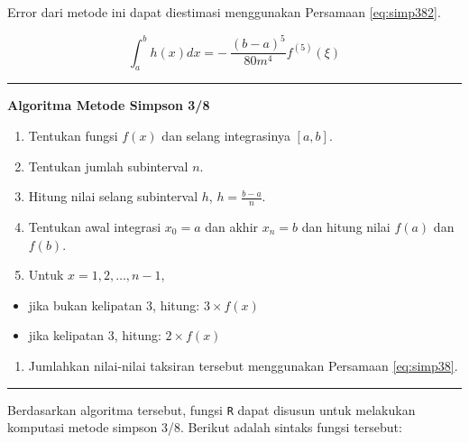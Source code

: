 \documentclass[
]{book}
\providecommand{\tightlist}{%
  \setlength{\itemsep}{0pt}\setlength{\parskip}{0pt}}
\theoremstyle{definition}
\theoremstyle{definition}
\theoremstyle{definition}
\theoremstyle{definition}
\theoremstyle{remark}
\begin{document}
Error dari metode ini dapat diestimasi menggunakan Persamaan \eqref{eq:simp382}.

\begin{equation}
\int_a^bh\left(x\right)dx=-\ \frac{\left(b-a\right)^5}{80m^4}f^{\left(5\right)}\left(\xi\right)
  \label{eq:simp382}
\end{equation}

\begin{center}\rule{0.5\linewidth}{0.5pt}\end{center}

\textbf{Algoritma Metode Simpson 3/8}

\begin{enumerate}
\def\labelenumi{\arabic{enumi}.}
\tightlist
\item
  Tentukan fungsi \(f\left(x\right)\) dan selang integrasinya \(\left[a,b\right]\).
\item
  Tentukan jumlah subinterval \(n\).
\item
  Hitung nilai selang subinterval \(h\), \(h=\frac{b-a}{n}\).
\item
  Tentukan awal integrasi \(x_0=a\) dan akhir \(x_n=b\) dan hitung nilai \(f\left(a\right)\) dan \(f\left(b\right)\).
\item
  Untuk \(x=1,2,\dots,n-1\),
\end{enumerate}

\begin{itemize}
\tightlist
\item
  jika bukan kelipatan 3, hitung: \(3\times f\left(x\right)\)
\item
  jika kelipatan 3, hitung: \(2\times f\left(x\right)\)
\end{itemize}

\begin{enumerate}
\def\labelenumi{\arabic{enumi}.}
\setcounter{enumi}{5}
\tightlist
\item
  Jumlahkan nilai-nilai taksiran tersebut menggunakan Persamaan \eqref{eq:simp38}.
\end{enumerate}

\begin{center}\rule{0.5\linewidth}{0.5pt}\end{center}

Berdasarkan algoritma tersebut, fungsi \texttt{R} dapat disusun untuk melakukan komputasi metode simpson 3/8. Berikut adalah sintaks fungsi tersebut:
\end{document}
